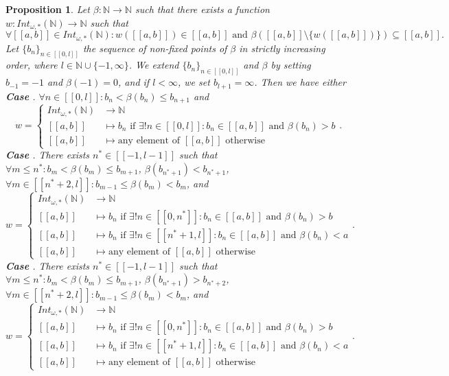 \documentclass[10pt,a4paper]{amsart}
\newtheorem{proposition}{Proposition}
\newcommand*\circled[1]{\tikz[baseline=(char.base)]{
            \node[shape=circle,draw,inner sep=2pt] (char) {#1};}}
\begin{document}
\begin{proposition}
\label{propBetaInt}
Let $\beta : \mathbb{N} \to \mathbb{N}$ such that there exists a function $w : Int_{\omega,*}(\mathbb{N}) \to \mathbb{N}$ such that
\[ \forall [\![a,b]\!] \in Int_{\omega,*}(\mathbb{N}) : w([\![a,b]\!]) \in [\![a,b]\!] \text{ and } \beta([\![a,b]\!] \setminus \{w([\![a,b]\!])\}) \subseteq [\![a,b]\!]. \]
Let $\{b_n\}_{n \in [\![0,l]\!]}$ the sequence of non-fixed points of $\beta$ in strictly increasing order, where $l \in \mathbb{N} \cup \{-1, \infty\}$. We extend $\{b_n\}_{n \in [\![0,l]\!]}$ and $\beta$ by setting $b_{-1} = -1$ and $\beta(-1) = 0$, and if $l < \infty$, we set $b_{l+1} = \infty$. Then we have either \\
\textbf{Case \circled{1}}. $\forall n \in [\![0,l]\!] : b_n < \beta(b_n) \leq b_{n+1}$ and
\[ w = \begin{cases} Int_{\omega,*}(\mathbb{N}) &\to \mathbb{N} \\ [\![a,b]\!] &\mapsto b_n \text { if } \exists! n \in [\![0,l]\!] : b_n \in [\![a,b]\!] \text{ and } \beta(b_n) > b \\ [\![a,b]\!] &\mapsto \text{any element of } [\![a,b]\!] \text{ otherwise} \end{cases}. \]
\textbf{Case \circled{2}}. There exists $n^* \in [\![-1,l-1]\!]$ such that $\forall m \leq n^* : b_m < \beta(b_m) \leq b_{m+1}$, $\beta(b_{n^*+1}) < b_{n^*+1}$, $\forall m \in [\![n^*+2,l]\!] : b_{m-1} \leq \beta(b_m) < b_m$, and
\[ w = \begin{cases} Int_{\omega,*}(\mathbb{N}) &\to \mathbb{N} \\ [\![a,b]\!] &\mapsto b_n \text { if } \exists! n \in [\![0,n^*]\!] : b_n \in [\![a,b]\!] \text{ and } \beta(b_n) > b \\ [\![a,b]\!] &\mapsto b_n \text { if } \exists! n \in [\![n^*+1,l]\!] : b_n \in [\![a,b]\!] \text{ and } \beta(b_n) < a \\ [\![a,b]\!] &\mapsto \text{any element of } [\![a,b]\!] \text{ otherwise} \end{cases}. \]
\textbf{Case \circled{3}}. There exists $n^* \in [\![-1,l-1]\!]$ such that $\forall m \leq n^* : b_m < \beta(b_m) \leq b_{m+1}$, $\beta(b_{n^*+1}) > b_{n^*+2}$, $\forall m \in [\![n^*+2,l]\!] : b_{m-1} \leq \beta(b_m) < b_m$, and 
\[ w = \begin{cases} Int_{\omega,*}(\mathbb{N}) &\to \mathbb{N} \\ [\![a,b]\!] &\mapsto b_n \text { if } \exists! n \in [\![0,n^*]\!] : b_n \in [\![a,b]\!] \text{ and } \beta(b_n) > b \\ [\![a,b]\!] &\mapsto b_n \text { if } \exists! n \in [\![n^*+1,l]\!] : b_n \in [\![a,b]\!] \text{ and } \beta(b_n) < a \\ [\![a,b]\!] &\mapsto \text{any element of } [\![a,b]\!] \text{ otherwise} \end{cases}. \]
\end{proposition}
\end{document}
